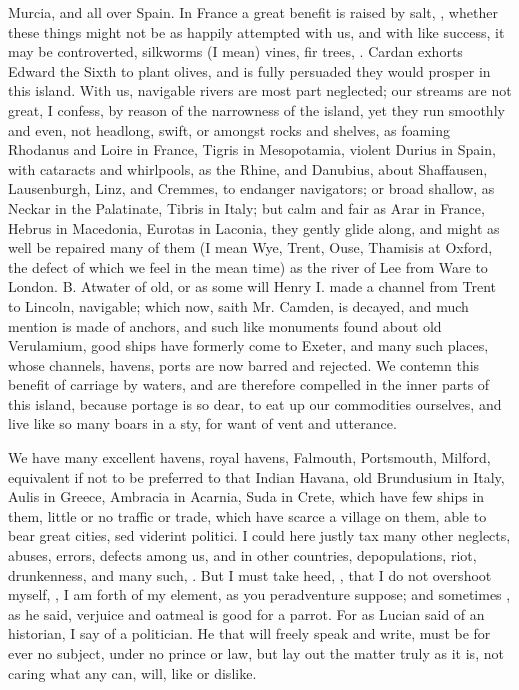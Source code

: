 {Murcia, and all over Spain. In France a great benefit is raised by
salt, \etc{}, whether these things might not be as happily attempted with
us, and with like success, it may be controverted, silkworms (I mean)
vines, fir trees, \etc{}. Cardan exhorts Edward the Sixth to plant olives,
and is fully persuaded they would prosper in this island. With us,
navigable rivers are most part neglected; our streams are not great, I
confess, by reason of the narrowness of the island, yet they run
smoothly and even, not headlong, swift, or amongst rocks and shelves,
as foaming Rhodanus and Loire in France, Tigris in Mesopotamia, violent
Durius in Spain, with cataracts and whirlpools, as the Rhine, and
Danubius, about Shaffausen, Lausenburgh, Linz, and Cremmes, to endanger
navigators; or broad shallow, as Neckar in the Palatinate, Tibris in
Italy; but calm and fair as Arar in France, Hebrus in Macedonia,
Eurotas in Laconia, they gently glide along, and might as well be
repaired many of them (I mean Wye, Trent, Ouse, Thamisis at Oxford, the
defect of which we feel in the mean time) as the river of Lee from Ware
to London. B. Atwater of old, or as some will Henry I. made a
channel from Trent to Lincoln, navigable; which now, saith Mr. Camden,
is decayed, and much mention is made of anchors, and such like
monuments found about old Verulamium, good ships have formerly
come to Exeter, and many such places, whose channels, havens, ports are
now barred and rejected. We contemn this benefit of carriage by waters,
and are therefore compelled in the inner parts of this island, because
portage is so dear, to eat up our commodities ourselves, and live like
so many boars in a sty, for want of vent and utterance.

We have many excellent havens, royal havens, Falmouth, Portsmouth,
Milford, \etc{} equivalent if not to be preferred to that Indian Havana,
old Brundusium in Italy, Aulis in Greece, Ambracia in Acarnia, Suda in
Crete, which have few ships in them, little or no traffic or trade,
which have scarce a village on them, able to bear great cities, sed
viderint politici. I could here justly tax many other neglects, abuses,
errors, defects among us, and in other countries, depopulations, riot,
drunkenness, \etc{} and many such, . But I must take heed, , that I do not
overshoot myself, , I am forth of my element, as you
peradventure suppose; and sometimes , as he said,
verjuice and oatmeal is good for a parrot. For as Lucian said of an
historian, I say of a politician. He that will freely speak and write,
must be for ever no subject, under no prince or law, but lay out the
matter truly as it is, not caring what any can, will, like or dislike.

}
